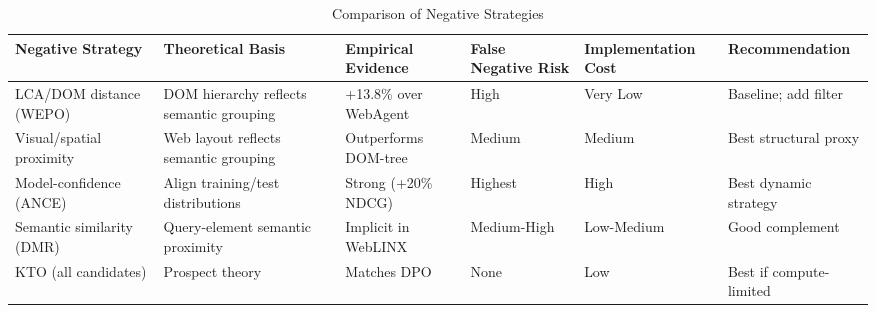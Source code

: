\documentclass[pdflatex,sn-mathphys-num]{sn-jnl}
\theoremstyle{thmstyleone}
\theoremstyle{thmstyletwo}
\theoremstyle{thmstylethree}
\begin{document}
\begin{table}[htbp]
\centering
\caption{Comparison of Negative Strategies}
\begin{tabular}{llllll}
\toprule
Negative Strategy & Theoretical Basis & Empirical Evidence & False Negative Risk & Implementation Cost & Recommendation \\
\midrule
LCA/DOM distance (WEPO) & DOM hierarchy reflects semantic grouping & +13.8\% over WebAgent & High & Very Low & Baseline; add filter \\
Visual/spatial proximity & Web layout reflects semantic grouping & Outperforms DOM-tree & Medium & Medium & Best structural proxy \\
Model-confidence (ANCE) & Align training/test distributions & Strong (+20\% NDCG) & Highest & High & Best dynamic strategy \\
Semantic similarity (DMR) & Query-element semantic proximity & Implicit in WebLINX & Medium-High & Low-Medium & Good complement \\
KTO (all candidates) & Prospect theory & Matches DPO & None & Low & Best if compute-limited \\
\bottomrule
\end{tabular}
\end{table}
\end{document}
